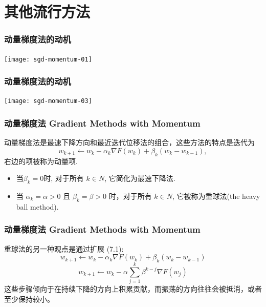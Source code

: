 \documentclass[handout]{beamer}
\begin{document}
\section{其他流行方法}


\begin{frame}[fragile]
  \frametitle{动量梯度法的动机}

  \begin{center}
    \texttt{[image: sgd-momentum-01]}

  \end{center}
\end{frame}

\begin{frame}[fragile]
  \frametitle{动量梯度法的动机}

  \begin{center}
    \texttt{[image: sgd-momentum-03]}

  \end{center}
\end{frame}

\begin{frame}[fragile]
	\frametitle{动量梯度法 Gradient Methods with Momentum}
	动量梯度法是最速下降方向和最近迭代位移法的组合，这些方法的特点是迭代为
	\begin{equation} \tag{7.1}
		 w_{k+1} \leftarrow w_{k}-\alpha_{k} \nabla F\left(w_{k}\right)+\beta_{k}\left(w_{k}-w_{k-1}\right),
	\end{equation}
	右边的项被称为动量项.

    \begin{itemize}
    \item  当$\beta_k = 0$时, 对于所有 $k \in N$, 它简化为最速下降法.
    \item 当 $\alpha_k = \alpha > 0$ 且 $\beta_k = \beta > 0$ 时，对于所有  $k \in N$,  它被称为重球法(the heavy ball method).
  \end{itemize}
	
\end{frame}

\begin{frame}[fragile]
	\frametitle{动量梯度法 Gradient Methods with Momentum}
重球法的另一种观点是通过扩展 (7.1):
\begin{equation}\tag{7-1}
	w_{k+1} \leftarrow w_{k}-\alpha_{k} \nabla F\left(w_{k}\right)+\beta_{k}\left(w_{k}-w_{k-1}\right)
\end{equation}
$$
w_{k+1} \leftarrow w_{k}-\alpha \sum_{j=1}^{k} \beta^{k-j} \nabla F\left(w_{j}\right)
$$
这些步骤倾向于在持续下降的方向上积累贡献，而振荡的方向往往会被抵消，或者至少保持较小。

\end{frame}
\end{document}
